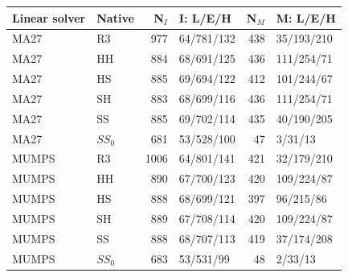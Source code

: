 \begin{tabular}{@{}llrlrl@{}}
\toprule
Linear solver & Native & N$_I$ & I: L/E/H & N$_M$ & M: L/E/H\\
\midrule
MA27 & R3 & 977 & 64/781/132 & 438 & 35/193/210\\
MA27 & HH & 884 & 68/691/125 & 436 & 111/254/71\\
MA27 & HS & 885 & 69/694/122 & 412 & 101/244/67\\
MA27 & SH & 883 & 68/699/116 & 436 & 111/254/71\\
MA27 & SS & 885 & 69/702/114 & 435 & 40/190/205\\
MA27 & $SS_0$ & 681 & 53/528/100 & 47 & 3/31/13\\
MUMPS & R3 & 1006 & 64/801/141 & 421 & 32/179/210\\
MUMPS & HH & 890 & 67/700/123 & 420 & 109/224/87\\
MUMPS & HS & 888 & 68/699/121 & 397 & 96/215/86\\
MUMPS & SH & 889 & 67/708/114 & 420 & 109/224/87\\
MUMPS & SS & 888 & 68/707/113 & 419 & 37/174/208\\
MUMPS & $SS_0$ & 683 & 53/531/99 & 48 & 2/33/13\\
\bottomrule
\end{tabular}
